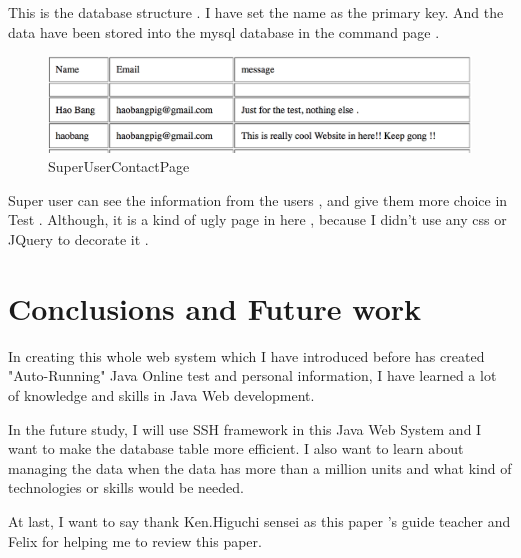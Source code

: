 \documentclass[12pt]{article}
\begin{document}
This is the database structure . I have set the name as the primary key.  And the data have been stored into the mysql database in the command page . 
 \begin{figure}[H]
\centering	
\includegraphics[width=15cm]{images/SuperUserContactPage.jpg}


\caption[SuperUserContactPage]{SuperUserContactPage}
\label{SuperUserContactPage}
\end{figure}


Super user can see the information from the users , and give them more choice in Test . Although, it is a kind of ugly page in here , because I didn't use any css or JQuery to decorate it . %
\cleardoublepage



\section{Conclusions and Future work}

	In creating this whole web system which I have introduced before has created "Auto-Running" Java Online test and personal information, I have learned a lot of knowledge and skills in Java Web development. 
	
	In the future study, I will use SSH framework in this Java Web System and I want to make the database table more efficient. I also want to learn about managing the data when the data has more than a million units and what kind of technologies or skills would be needed.
	
	 At last, I want to say thank Ken.Higuchi sensei as this paper 's guide teacher and Felix for helping me to review this paper.


\cleardoublepage



\thispagestyle{empty}

\end{document}
